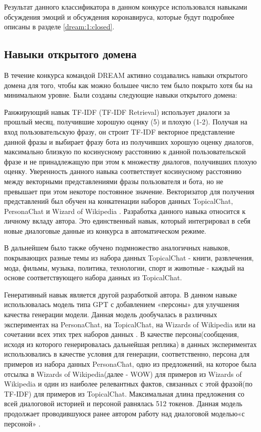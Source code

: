 Результат данного классификатора в данном конкурсе использовался навыками обсуждения эмоций и обсуждения коронавируса, которые будут подробнее описаны в разделе \ref{dream:1:closed}.

\subsection{Навыки открытого домена}

В течение конкурса командой {DREAM} активно создавались навыки открытого домена для того, чтобы как можно большее число тем было покрыто хотя бы на минимальном уровне. Были созданы следующие навыки открытого домена:

Ранжирующий навык TF-IDF (TF-IDF Retrieval) использует диалоги за прошлый месяц, получившие хорошую оценку (5) и плохую (1-2). Получая на вход пользовательскую фразу, он строит TF-IDF векторное представление~\cite{tfidf} данной фразы и выбирает фразу бота из получивших хорошую оценку диалогов, максимально близкую по косинусному расстоянию к данной пользовательской фразе и не принадлежащую при этом к множеству диалогов, получивших плохую оценку. Уверенность данного навыка соответствует косинусному расстоянию между векторными представлениями фразы пользователя и бота, но не превышает при этом некоторе постоянное значение. Векторизатор для получения представлений был обучен на конкатенации наборов данных TopicalChat\cite{topicalchat}, PersonaChat \cite{personachat} и Wizard of Wikipedia \cite{wow}. Разработка данного навыка относится к личному вкладу автора.  Это единственный навык, который интегрировал в себя новые диалоговые данные из конкурса в автоматическом режиме.

В дальнейшем было также обучено подмножество аналогичных навыков, покрывающих разные темы из набора данных TopicalChat  - книги, развлечения, мода, фильмы, музыка, политика, технологии, спорт и животные - каждый на основе соответствующего набора данных из TopicalChat.

Генеративный навык является другой разработкой автора. В данном навыке использовалась модель типа GPT\cite{radford_2018_gpt} с добавлением «персоны» для улучшения качества генерации модели. Данная модель дообучалась в различных экспериментах на PersonaChat, на TopicalChat, на Wizards of Wikipedia или на сочетании всех этих трех наборов данных . В качестве персоны(сообщения, исходя из которого генерировалась дальнейшая реплика) в данных экспериментах использовались в качестве условия для генерации, соответственно, персона для примеров из набора данных PersonaChat, одно из предложений, на которое была отсылка в Wizards of Wikipedia(далее - WOW) для примеров из Wizards of Wikipedia и один из наиболее релевантных фактов, связанных с этой фразой(по TF-IDF) для примеров из TopicalChat. Максимальная длина предложения со всей диалоговой историей и персоной равнялась 512 токенов.  Данная модель продолжает проводившуюся ранее автором работу над диалоговой моделью«с персоной» \cite{Болотин_Карпов_Рашков_Шкурак_2019}.

